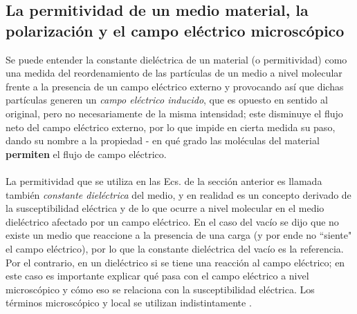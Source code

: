 \documentclass[12pt, notitlepage]{article}
\begin{document}
\subsection{La permitividad de un medio material, la polarización y el campo eléctrico microscópico}
Se puede entender la constante dieléctrica de un material (o permitividad) como una medida del reordenamiento de las partículas de un medio a nivel molecular frente a la presencia de un campo eléctrico externo y provocando así que dichas partículas generen un \textit{campo eléctrico inducido}, que es opuesto en sentido al original, pero no necesariamente de la misma intensidad; este disminuye el flujo neto del campo eléctrico externo, por lo que impide en cierta medida su paso, dando su nombre a la propiedad - en qué grado las moléculas del material \textbf{permiten} el flujo de campo eléctrico.\\\\
La permitividad que se utiliza en las Ecs. de la sección anterior es llamada también \textit{constante dieléctrica} del medio, y en realidad es un concepto derivado de la susceptibilidad eléctrica y de lo que ocurre a nivel molecular en el medio dieléctrico afectado por un campo eléctrico. En el caso del vacío se dijo que no existe un medio que reaccione a la presencia de una carga (y por ende no ``siente" el campo eléctrico), por lo que la constante dieléctrica del vacío es la referencia. Por el contrario, en un dieléctrico si se tiene una reacción al campo eléctrico; en este caso es importante explicar qué pasa con el campo eléctrico a nivel microscópico y cómo eso se relaciona con la susceptibilidad eléctrica. Los términos microscópico y local se utilizan indistintamente \cite{Kantorovich}.
\end{document}
